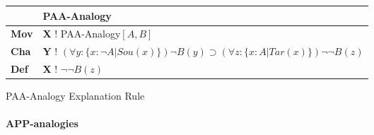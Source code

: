 					\begin{Scheme}[H]\footnotesize
               		\centering
               		\begin{tabular}{l l}
               			                   & \textbf{PAA-Analogy}                                                                                                                                                                                                                                                                         \\ \toprule
               			\textbf{Mov}      & \textbf{X} ! PAA-Analogy$[A,B]$                                                                                                                                                                                                                                                                                     \\ \midrule
               			\textbf{Cha} & \textbf{Y} ! $(\forall y: \{ x: \neg A| Sou(x)\} ) \neg B(y) \supset (\forall z : \{ x: A| Tar(x)\} ) \neg \neg B(z)$                                                                                                                                                                                                                                                                                           \\ \midrule
               			\textbf{Def}   & \textbf{X} ! $\neg \neg B(z)$ \\ \bottomrule
               		\end{tabular}
               		\caption{PAA-Analogy Explanation Rule}
               		\label{PAAAnalogyExplanation}
					\end{Scheme}

			\newpage
			\paragraph{APP-analogies}
			
